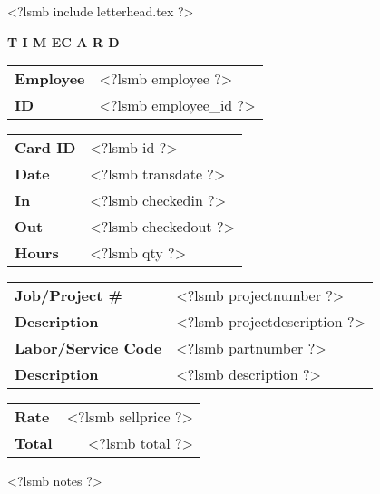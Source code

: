 \documentclass{scrartcl}
\begin{document}
\pagestyle{myheadings}
\thispagestyle{empty}

\fontsize{10pt}{12pt}\selectfont

<?lsmb include letterhead.tex ?>

\centerline{\textbf{T I M E}\hspace{0.5cm}\textbf{C A R D}}

\vspace*{0.5cm}

\begin{tabular}[t]{ll}
  \textbf{Employee} & <?lsmb employee ?> \\
  \textbf{ID} & <?lsmb employee_id ?> \\
\end{tabular}
\hfill
\begin{tabular}[t]{ll}
  \textbf{Card ID} & <?lsmb id ?> \\
  \textbf{Date} & <?lsmb transdate ?> \\
  \textbf{In} & <?lsmb checkedin ?> \\
  \textbf{Out} & <?lsmb checkedout ?> \\
  \textbf{Hours} & <?lsmb qty ?> \\
\end{tabular}

\vspace{1cm}

\begin{tabular}[b]{ll}
  \textbf{Job/Project \#} & <?lsmb projectnumber ?> \\
  \textbf{Description} & <?lsmb projectdescription ?> \\
  \textbf{Labor/Service Code} & <?lsmb partnumber ?> \\
  \textbf{Description} & <?lsmb description ?> \\
\end{tabular}
\hfill
\begin{tabular}[b]{lr}
  \textbf{Rate} & <?lsmb sellprice ?> \\
  \textbf{Total} & <?lsmb total ?> \\
\end{tabular}
  
\vspace{0.3cm}

<?lsmb notes ?>
 
\end{document}
